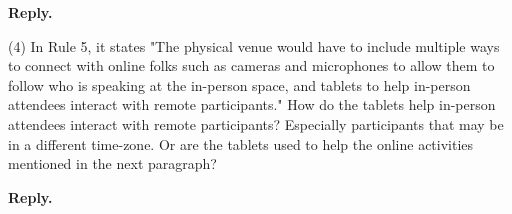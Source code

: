 \documentclass{article}
\newenvironment{Reply}{\noindent\color{BlueViolet}\textbf{Reply.}}{\vspace{1em}}
\begin{document}
\begin{Reply}
\end{Reply}

(4) In Rule 5, it states "The physical venue would have to include multiple ways to connect with online folks such as cameras and microphones to allow them to follow who is speaking at the in-person space, and tablets to help in-person attendees interact with remote participants." How do the tablets help in-person attendees interact with remote participants? Especially participants that may be in a different time-zone. Or are the tablets used to help the online activities mentioned in the next paragraph?

\begin{Reply}
\end{Reply}
\end{document}
